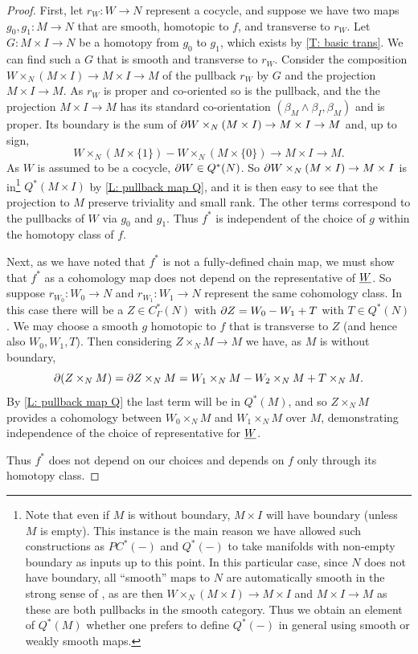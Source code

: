 \begin{proof}
First, let $r_W \colon W \to N$ represent a cocycle, and suppose we have two maps $g_0, g_1:M\to N$ that are smooth, homotopic to $f$, and transverse to $r_W$.
Let $G:M\times I\to N$ be a homotopy from $g_0$ to $g_1$, which exists by \cref{T: basic trans}. We can find such a $G$ that is  smooth and transverse to $r_W$. Consider the composition $W\times_N (M\times I)\to M\times I\to M$ of the pullback $r_W$ by $G$ and the projection $M\times I\to M$. As $r_W$ is proper and co-oriented so is the pullback, and the the projection $M\times I\to M$ has its standard co-orientation $(\beta_M\wedge \beta_I,\beta_M)$ and is proper.  Its boundary is the sum of $\partial W\times_N (M\times I)\to M\times I\to M$ and, up to sign, $$W\times_N (M\times \{1\}) - W\times_N(M\times \{0\})\to M\times I\to M.$$ As $W$ is assumed to be a cocycle, $\partial W\in Q^*(N)$. So $\partial W\times_N (M\times I)\to M\times I$ is in\footnote{Note that even if $M$ is without boundary, $M\times I$ will have boundary (unless $M$ is empty). This instance is the main reason we have allowed such constructions as $PC^*(-)$ and $Q^*(-)$ to take manifolds with non-empty boundary as inputs up to this point. In this particular case, since $N$ does not have boundary, all ``smooth'' maps to $N$ are automatically smooth in the strong sense of \cite{Joy12}, as are then $W\times_N (M\times I)\to M\times I$ and $M\times I\to M$ as these are both pullbacks in the smooth category. Thus we obtain an element of $Q^*(M)$ whether one prefers to define $Q^*(-)$ in general using smooth or weakly smooth maps.} $Q^*(M\times I)$ by \cref{L: pullback map Q}, and it is then easy to see that the projection to $M$ preserve triviality and small rank. The other terms correspond to the pullbacks of $W$ via $g_0$ and $g_1$. Thus $f^*$ is independent of the choice of $g$ within the homotopy class of $f$.

Next, as we have noted that $f^*$ is not a fully-defined chain map, we must show that $f^*$ as a cohomology map does not depend on the representative of  $\underline{W}$. So suppose $r_{W_0}:W_0\to N$ and $r_{W_1}:W_1\to N$ represent the same cohomology class. In this case there will be a $Z\in C^*_\Gamma(N)$ with $\partial Z=W_0-W_1+T$ with $T\in Q^*(N)$. We may choose a smooth $g$ homotopic to $f$ that is transverse to $Z$ (and hence also $W_0,W_1, T$). Then considering $Z\times_N M\to M$ we have, as $M$ is without boundary,
$$\partial(Z\times_N M)=\partial Z\times_N M=W_1\times_N M -W_2\times_N M+T\times_N M.$$
By \cref{L: pullback map Q} the last term will be in $Q^*(M)$, and so $Z\times_NM$ provides a cohomology between $W_0\times_NM$ and $W_1\times_NM$ over $M$, demonstrating independence of the choice of representative for $\underline{W}$.

Thus $f^*$ does not depend on our choices and depends on $f$ only through its homotopy class.
\end{proof}

